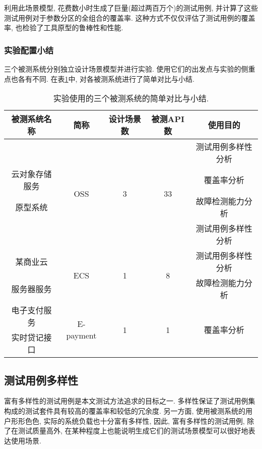                 利用此场景模型, 花费数小时生成了巨量(超过两百万个)的测试用例, 并计算了这些测试用例对于参数分区的全组合的覆盖率. 这种方式不仅仅评估了测试用例的覆盖率, 也检验了工具原型的鲁棒性和性能.

            \subsubsection*{实验配置小结}
                三个被测系统分别独立设计场景模型并进行实验. 使用它们的出发点与实验的侧重点也各有不同. 在表\ref{tab:sut_summary}中, 对各被测系统进行了简单对比与小结.

                \begin{table}[!htb]
                    \centering
                    \begin{tabular}{ccccc}
                        \toprule
                            被测系统名称 & 简称 & 设计场景数 & 被测API数 & 使用目的 \\
                        \midrule
                            & \multirow{4}{*}{OSS} & \multirow{4}{*}{3} & \multirow{4}{*}{33} & 测试用例多样性分析 \\
                            云对象存储服务 & & & & 覆盖率分析\\
                            原型系统 & & & & 故障检测能力分析\\
                            & & & & 测试用例多样性分析\\
                            \hline
                            某商业云 & \multirow{2}{*}{ECS} & \multirow{2}{*}{1} & \multirow{2}{*}{8} & 测试用例多样性分析 \\
                            服务器服务 & & & & 故障检测能力分析 \\
                            \hline
                            电子支付服务 & \multirow{2}{*}{E-payment} & \multirow{2}{*}{1} & \multirow{2}{*}{1} & \multirow{2}{*}{覆盖率分析} \\
                            实时贷记接口 & & & & \\
                        \bottomrule
                    \end{tabular}
                    \caption[被测系统总结表]{实验使用的三个被测系统的简单对比与小结.}
                    \label{tab:sut_summary}
                \end{table}

            
        \subsection{测试用例多样性}
            富有多样性的测试用例是本文测试方法追求的目标之一. 多样性保证了测试用例集构成的测试套件具有较高的覆盖率和较低的冗余度. 另一方面, 使用被测系统的用户形形色色, 实际的系统负载也十分富有多样性, 因此, 富有多样性的测试用例, 除了在测试质量高外, 在某种程度上也能说明生成它们的测试场景模型可以很好地表达使用场景.
            
